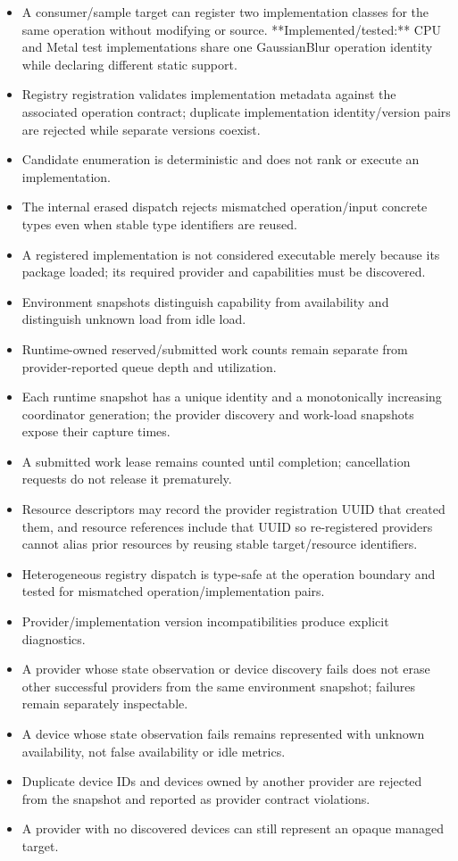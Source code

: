 \exitcriteria
\begin{itemize}
  \item A consumer/sample target can register two implementation classes for the same operation without modifying \IPP{} or \IPR{} source. **Implemented/tested:** CPU and Metal test implementations share one GaussianBlur operation identity while declaring different static support.
  \item Registry registration validates implementation metadata against the associated operation contract; duplicate implementation identity/version pairs are rejected while separate versions coexist.
  \item Candidate enumeration is deterministic and does not rank or execute an implementation.
  \item The internal erased dispatch rejects mismatched operation/input concrete types even when stable type identifiers are reused.
  \item A registered implementation is not considered executable merely because its package loaded; its required provider and capabilities must be discovered.
  \item Environment snapshots distinguish capability from availability and distinguish unknown load from idle load.
  \item Runtime-owned reserved/submitted work counts remain separate from provider-reported queue depth and utilization.
  \item Each runtime snapshot has a unique identity and a monotonically increasing coordinator generation; the provider discovery and work-load snapshots expose their capture times.
  \item A submitted work lease remains counted until completion; cancellation requests do not release it prematurely.
  \item Resource descriptors may record the provider registration UUID that created them, and resource references include that UUID so re-registered providers cannot alias prior resources by reusing stable target/resource identifiers.
  \item Heterogeneous registry dispatch is type-safe at the operation boundary and tested for mismatched operation/implementation pairs.
  \item Provider/implementation version incompatibilities produce explicit diagnostics.
  \item A provider whose state observation or device discovery fails does not erase other successful providers from the same environment snapshot; failures remain separately inspectable.
  \item A device whose state observation fails remains represented with unknown availability, not false availability or idle metrics.
  \item Duplicate device IDs and devices owned by another provider are rejected from the snapshot and reported as provider contract violations.
  \item A provider with no discovered devices can still represent an opaque managed target.
\end{itemize}

